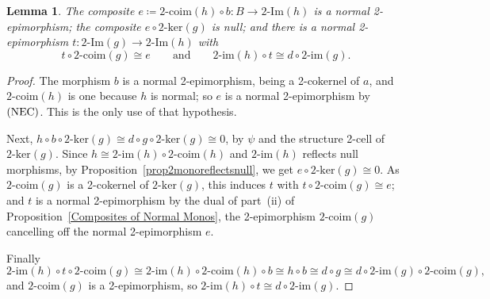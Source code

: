\documentclass[reqno,a4paper]{amsart}
\numberwithin{equation}{section}
\theoremstyle{plain}
\newtheorem{lemma}[subsection]{Lemma}
\theoremstyle{definition}
\def\nameit#1{\textrm{#1}~}
\def\prox{\nameit{Proposition}}
\newcommand{\comp}{\circ}
\newcommand{\iso}{\cong}
\renewcommand{\1}{\onecat{1}}
\newcommand{\NEC}{\textup{(NEC)}}
\newcommand{\twoker}{\ensuremath{2\text{-}\mathrm{ker}}}
\newcommand{\TwoImg}{\ensuremath{2\text{-}\mathrm{Im}}}
\newcommand{\twoimg}{\ensuremath{2\text{-}\mathrm{im}}}
\newcommand{\twocoim}{\ensuremath{2\text{-}\mathrm{coim}}}
\begin{document}
\begin{lemma}\label{L:NSDEpi}
	The composite \(e\coloneq\twocoim(h)\comp b\colon B\to\TwoImg(h)\) is a normal 2-epimorphism; the composite \(e\comp\twoker(g)\) is null; and there is a normal 2-epimorphism \(t\colon\TwoImg(g)\to\TwoImg(h)\) with
	\[
		t\comp\twocoim(g)\iso e\qquad\text{and}\qquad\twoimg(h)\comp t\iso d\comp\twoimg(g)\text{.}
	\]
\end{lemma}
\begin{proof}
	The morphism \(b\) is a normal 2-epimorphism, being a 2-cokernel of \(a\), and \(\twocoim(h)\) is one because \(h\) is normal; so \(e\) is a normal 2-epimorphism by \(\NEC\). This is the only use of that hypothesis.

	Next, \(h\comp b\comp\twoker(g)\iso d\comp g\comp\twoker(g)\iso 0\), by \(\psi\) and the structure 2-cell of \(\twoker(g)\). Since \(h\iso\twoimg(h)\comp\twocoim(h)\) and \(\twoimg(h)\) reflects null morphisms, by \prox\ref{prop2monoreflectsnull}, we get \(e\comp\twoker(g)\iso 0\). As \(\twocoim(g)\) is a 2-cokernel of \(\twoker(g)\), this induces \(t\) with \(t\comp\twocoim(g)\iso e\); and \(t\) is a normal 2-epimorphism by the dual of part~\textup{(ii)} of \prox\ref{Composites of Normal Monos}, the 2-epimorphism \(\twocoim(g)\) cancelling off the normal 2-epimorphism \(e\).

	Finally
	\[
		\twoimg(h)\comp t\comp\twocoim(g)\iso\twoimg(h)\comp\twocoim(h)\comp b\iso h\comp b\iso d\comp g\iso d\comp\twoimg(g)\comp\twocoim(g)\text{,}
	\]
	and \(\twocoim(g)\) is a 2-epimorphism, so \(\twoimg(h)\comp t\iso d\comp\twoimg(g)\).
\end{proof}
\end{document}
